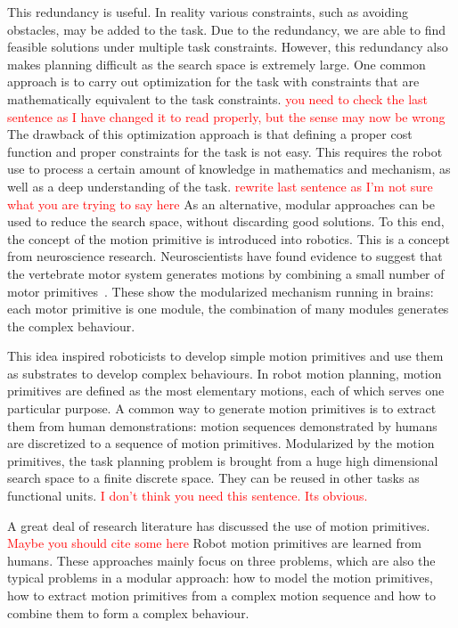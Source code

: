 This redundancy is useful. In reality various constraints, such as avoiding obstacles, may be added to the task. Due to the redundancy, we are able to find feasible solutions under multiple task constraints. However, this redundancy also makes planning difficult as the search space is extremely large. One common approach is to carry out optimization for the task with constraints that are mathematically equivalent to the task constraints.
\textcolor{red}{you need to check the last sentence as I have changed it to read properly, but the sense may now be wrong}
The drawback of this optimization approach is that defining a proper cost function and proper constraints for the task is not easy. This requires the robot use to process a certain amount of knowledge in mathematics and mechanism, as well as a deep understanding of the task.
\textcolor{red}{rewrite last sentence as I'm not sure what you are trying to say here}
As an alternative, modular approaches can be used to reduce the search space, without discarding good solutions. To this end, the concept of the motion primitive is introduced into robotics. This is a concept from neuroscience research. Neuroscientists have found evidence to suggest that the vertebrate motor system generates motions by combining a small number of motor primitives~\citep{mussa1994linear,mussa1999modular,bizzi2008combining,grillner2011control}. These show the modularized mechanism running in brains: each motor primitive is one module, the combination of many modules generates the complex behaviour.

This idea inspired roboticists to develop simple motion primitives and use them as substrates to develop complex behaviours. In robot motion planning, motion primitives are defined as the most elementary motions, each of which serves one particular purpose. A common way to generate motion primitives is to extract them from human demonstrations: motion sequences demonstrated by humans are discretized to a sequence of motion primitives. Modularized by the motion primitives, the task planning problem is brought from a huge high dimensional search space to a finite discrete space.
They can be reused in other tasks as functional units. %
\textcolor{red}{I don't think you need this sentence. Its obvious.}

A great deal of research literature has discussed the use of motion primitives.
\textcolor{red}{Maybe you should cite some here}
Robot motion primitives are learned from humans. These approaches mainly focus on three problems, which are also the typical problems in a modular approach: how to model the motion primitives, how to extract motion primitives from a complex motion sequence and how to combine them to form a complex behaviour.

